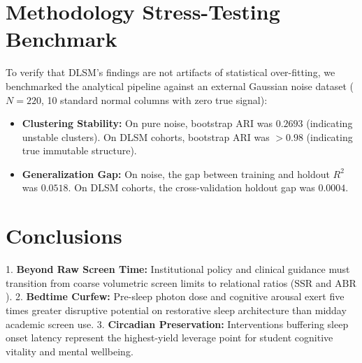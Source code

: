 \documentclass[10pt,twocolumn,a4paper]{article}
\begin{document}
\section{Methodology Stress-Testing Benchmark}
To verify that DLSM's findings are not artifacts of statistical over-fitting, we benchmarked the analytical pipeline against an external Gaussian noise dataset ($N=220$, 10 standard normal columns with zero true signal):
\begin{itemize}
    \item \textbf{Clustering Stability:} On pure noise, bootstrap ARI was $\mathbf{0.2693}$ (indicating unstable clusters). On DLSM cohorts, bootstrap ARI was $\mathbf{>0.98}$ (indicating true immutable structure).
    \item \textbf{Generalization Gap:} On noise, the gap between training and holdout $R^2$ was $0.0518$. On DLSM cohorts, the cross-validation holdout gap was $0.0004$.
\end{itemize}

\section{Conclusions}
1. \textbf{Beyond Raw Screen Time:} Institutional policy and clinical guidance must transition from coarse volumetric screen limits to relational ratios ($\text{SSR}$ and $\text{ABR}$).
2. \textbf{Bedtime Curfew:} Pre-sleep photon dose and cognitive arousal exert five times greater disruptive potential on restorative sleep architecture than midday academic screen use.
3. \textbf{Circadian Preservation:} Interventions buffering sleep onset latency represent the highest-yield leverage point for student cognitive vitality and mental wellbeing.



\end{document}
